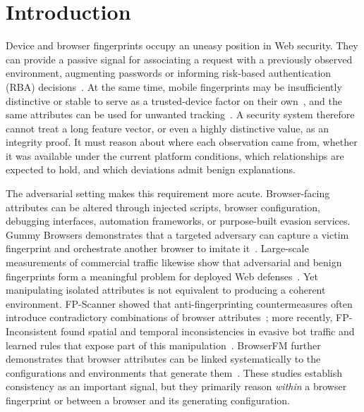\section{Introduction}
\label{sec:introduction}

Device and browser fingerprints occupy an uneasy position in Web security. They can provide a passive signal for associating a request with a previously observed environment, augmenting passwords or informing risk-based authentication (RBA) decisions~\cite{alaca2016device,papaioannou2023survey}. At the same time, mobile fingerprints may be insufficiently distinctive or stable to serve as a trusted-device factor on their own~\cite{spooren2015harmful}, and the same attributes can be used for unwanted tracking~\cite{laperdrix2020browser,w3c2025fingerprinting}. A security system therefore cannot treat a long feature vector, or even a highly distinctive value, as an integrity proof. It must reason about where each observation came from, whether it was available under the current platform conditions, which relationships are expected to hold, and which deviations admit benign explanations.

The adversarial setting makes this requirement more acute. Browser-facing attributes can be altered through injected scripts, browser configuration, debugging interfaces, automation frameworks, or purpose-built evasion services. Gummy Browsers demonstrates that a targeted adversary can capture a victim fingerprint and orchestrate another browser to imitate it~\cite{liu2022gummy}. Large-scale measurements of commercial traffic likewise show that adversarial and benign fingerprints form a meaningful problem for deployed Web defenses~\cite{wu2023manyfaces}. Yet manipulating isolated attributes is not equivalent to producing a coherent environment. FP-Scanner showed that anti-fingerprinting countermeasures often introduce contradictory combinations of browser attributes~\cite{vastel2018fpscanner}; more recently, FP-Inconsistent found spatial and temporal inconsistencies in evasive bot traffic and learned rules that expose part of this manipulation~\cite{venugopalan2025fpinconsistent}. BrowserFM further demonstrates that browser attributes can be linked systematically to the configurations and environments that generate them~\cite{huyghe2025browserfm}. These studies establish consistency as an important signal, but they primarily reason \emph{within} a browser fingerprint or between a browser and its generating configuration.

